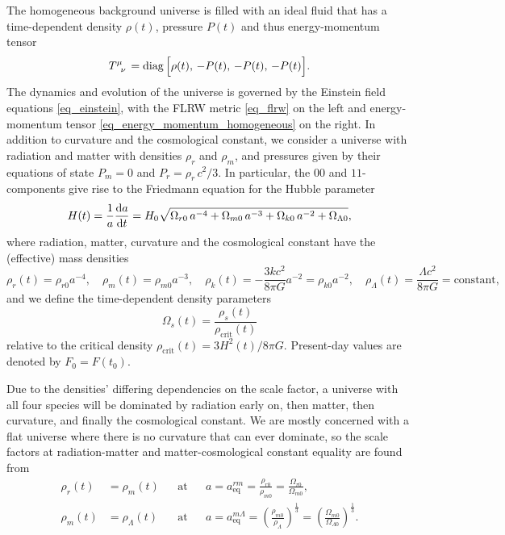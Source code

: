 \documentclass[10pt,a4paper]{article}
\DeclareMathOperator{\diag}{diag}
\begin{document}
The homogeneous background universe is filled with an ideal fluid that has a
time-dependent density $\rho(t)$, pressure $P(t)$ and thus energy-momentum tensor
\begin{equation}
	T\indices{^\mu_\nu} = \diag\Big[\rho(t),\, -P(t),\, -P(t),\, -P(t)\Big].
\label{eq_energy_momentum_homogeneous}
\end{equation}
The dynamics and evolution of the universe is governed by the Einstein field equations \eqref{eq_einstein},
with the FLRW metric \eqref{eq_flrw} on the left and energy-momentum tensor \eqref{eq_energy_momentum_homogeneous} on the right.
In addition to curvature and the cosmological constant,
we consider a universe with radiation and matter with densities $\rho_r$ and $\rho_m$,
and pressures given by their equations of state $P_m = 0$ and $P_r = \rho_r \, c^2 / 3$.
In particular, the $00$ and $11$-components give rise to the Friedmann equation for the Hubble parameter
\begin{equation}
	H(t) = \frac{1}{a} \odv{a}{t} = H_0 \sqrt{\Omega_{r0} \, a^{-4} + \Omega_{m0} \, a^{-3} + \Omega_{k0} \, a^{-2} + \Omega_{\Lambda0}},
\label{eq_friedmann}
\end{equation}
where radiation, matter, curvature and the cosmological constant have the (effective) mass densities
\begin{equation}
	\rho_r(t) = \rho_{r0} a^{-4}, \quad
	\rho_m(t) = \rho_{m0} a^{-3}, \quad
	\rho_k(t) = -\frac{3kc^2}{8 \pi G} a^{-2} = \rho_{k0} a^{-2}, \quad
	\rho_\Lambda(t) = \frac{\Lambda c^2}{8 \pi G} = \text{constant},
\end{equation}
and we define the time-dependent density parameters
\begin{equation}
	\Omega_s(t) = \frac{\rho_s(t)}{\rho_\text{crit}(t)}
\label{eq_density_parameters}
\end{equation}
relative to the critical density $\rho_\text{crit}(t) = 3H^2(t)/8\pi G$.
Present-day values are denoted by $F_0=F(t_0)$.

Due to the densities' differing dependencies on the scale factor,
a universe with all four species will be dominated by radiation early on, then matter, then curvature, and finally the cosmological constant.
We are mostly concerned with a flat universe where there is no curvature that can ever dominate,
so the scale factors at radiation-matter and matter-cosmological constant equality are found from
\begin{subequations}
\begin{align}
	\rho_r(t) &= \rho_m(t)       && \text{at} && a = a_\text{eq}^{rm} = \frac{\rho_{r0}}{\rho_{m0}} = \frac{\Omega_{r0}}{\Omega_{m0}}, \label{eq_equality_radiation_matter} \\
	\rho_m(t) &= \rho_\Lambda(t) && \text{at} && a = a_\text{eq}^{m\Lambda} = \left(\frac{\rho_{m0}}{\rho_{\Lambda}}\right)^\frac13 = \left(\frac{\Omega_{m0}}{\Omega_{\Lambda0}}\right)^\frac13. \label{eq_equality_matter_cosmological_constant}
\end{align}
\label{eq_equality_times}
\end{subequations}
\end{document}
